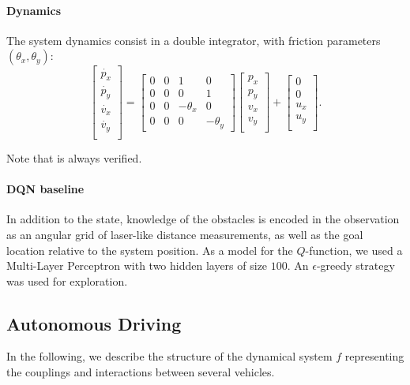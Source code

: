 \documentclass{article}
\begin{document}
\paragraph{Dynamics}
The system dynamics consist in a double integrator, with friction parameters $(\theta_x, \theta_y)$:
$$
\begin{bmatrix}
\dot{p_x}\\
\dot{p_y}\\
\dot{v_x}\\
\dot{v_y}\\
\end{bmatrix} = 
\begin{bmatrix}
0 & 0 & 1 & 0 \\
0 & 0 & 0 & 1 \\
0 & 0 & -\theta_x & 0 \\
0 & 0 & 0 & -\theta_y
\end{bmatrix}
\begin{bmatrix}
{p_x}\\
{p_y}\\
{v_x}\\
{v_y}\\
\end{bmatrix}
+
\begin{bmatrix}
0\\
0\\
{u_x}\\
{u_y}\\
\end{bmatrix}.
$$

Note that  is always verified. 

\paragraph{DQN baseline}

In addition to the state, knowledge of the obstacles is encoded in the observation as an angular grid of laser-like distance measurements, as well as the goal location relative to the system position.
As a model for the $Q$-function, we used a Multi-Layer Perceptron with two hidden layers of size $100$. An $\epsilon$-greedy strategy was used for exploration.

\subsection{Autonomous Driving}

In the following, we describe the structure of the dynamical system $f$ representing the couplings and interactions between several vehicles.
\end{document}
